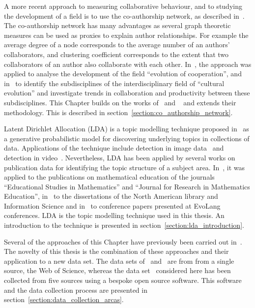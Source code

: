 A more recent approach to measuring collaborative behaviour, and to studying the
development of a field is to use the co-authorship network, as described
in~\cite{Liu2015}. The co-authorship network has many advantages as several
graph theoretic measures can be used as proxies to explain author relationships.
For example the average degree of a node corresponds to the average number of
an authors' collaborators, and clustering coefficient corresponds to the extent that
two collaborators of an author also collaborate with each other.
In~\cite{Liu2015}, the approach was applied to analyse the development of the field
``evolution of cooperation'', and in~\cite{youngblood2018} to identify the
subdisciplines of the interdisciplinary field of ``cultural evolution'' and
investigate trends in collaboration and productivity between these subdisciplines.
This Chapter builds on the works of~\cite{Liu2015} and ~\cite{youngblood2018} 
and extends their methodology. This is described in
section~\ref{section:co_authorship_network}.

Latent Dirichlet Allocation (LDA) is a topic modelling technique proposed
in~\cite{Blei2003} as a generative probabilistic model for discovering
underlying topics in collections of data.
Applications of the technique include detection in image data~\cite{Agarwal2008,
Coelho2010} and detection in video~\cite{Niebles2008, Wang2008}. Nevertheless,
LDA has been applied by several works on publication data for identifying the
topic structure of a subject area. In~\cite{Inglis2018}, it was applied to the
publications on mathematical education of the journals ``Educational Studies in
Mathematics'' and ``Journal for Research in Mathematics Education'', in~\cite{Sugimoto2011}
to the dissertations of the North American library and Information Science and
in~\cite{Bergmann2018} to conference papers presented at EvoLang conferences.
LDA is the topic modelling technique used in this thesis. An introduction to
the technique is presented in section~\ref{section:lda_introduction}.

Several of the approaches of this Chapter have previously been carried
out in~\cite{Bergmann2018,Liu2015,Sugimoto2011, youngblood2018}. The novelty of this
thesis is the combination of these approaches and their application to a new data
set. The data sets of~\cite{Liu2015} and~\cite{youngblood2018} are from 
from a single source, the Web of Science, whereas the data set~\cite{pd_data_2018}
considered here has been collected from five sources using a bespoke open source
software. This software and the data collection process are presented in
section~\ref{section:data_collection_arcas}.

